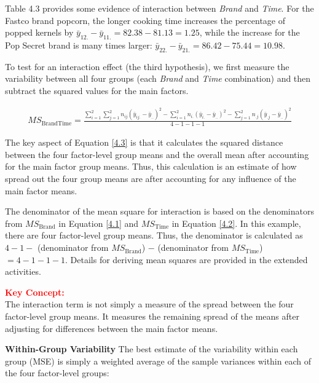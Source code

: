 \documentclass[
]{report}
\begin{document}
Table 4.3 provides some evidence of interaction between \emph{Brand} and \emph{Time}. For the Fastco brand popcorn, the longer cooking time increases the percentage of popped kernels by \(\bar{y}_{12.} - \bar{y}_{11.} = 82.38 - 81.13 = 1.25\), while the increase for the Pop Secret brand is many times larger: \(\bar{y}_{22.} - \bar{y}_{21.} = 86.42 - 75.44 = 10.98\).

To test for an interaction effect (the third hypothesis), we first measure the variability between all four groups (each \emph{Brand} and \emph{Time} combination) and then subtract the squared values for the main factors.

\begin{align}\label{4.3}
MS_{\text{BrandTime}} = \frac{\sum_{i=1}^{2}\sum_{j=1}^{2} n_{ij}(\bar{y}_{ij.} - \bar{y}_{..})^2 - \sum_{i=1}^{2} n_{i.}(\bar{y}_{i.} - \bar{y}_{..})^2 - \sum_{j=1}^{2} n_{.j}(\bar{y}_{.j} - \bar{y}_{..})^2}{4 - 1 - 1 - 1}
\tag{4.3}
\end{align}

The key aspect of Equation \ref{4.3} is that it calculates the squared distance between the four factor-level group means and the overall mean after accounting for the main factor group means. Thus, this calculation is an estimate of how spread out the four group means are after accounting for any influence of the main factor means.

The denominator of the mean square for interaction is based on the denominators from \(MS_{\text{Brand}}\) in Equation \ref{4.1} and \(MS_{\text{Time}}\) in Equation \ref{4.2}. In this example, there are four factor-level group means. Thus, the denominator is calculated as \(4 - 1 -\) (denominator from \(MS_{\text{Brand}}\)) \(-\) (denominator from \(MS_{\text{Time}}\)) \(= 4 - 1 - 1 - 1\). Details for deriving mean squares are provided in the extended activities.

\large

\textbf{\textcolor{red}{Key Concept:}}\\
\color{red}
The interaction term is not simply a measure of the spread between the four factor-level group means. It measures the remaining spread of the means after adjusting for differences between the main factor means.
\color{black}
\normalsize

\textbf{Within-Group Variability} The best estimate of the variability within each group (MSE) is simply a weighted average of the sample variances within each of the four factor-level groups:
\end{document}
